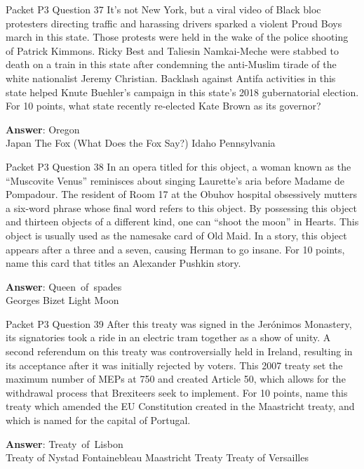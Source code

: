 \begin{frame}{Packet P3 Question 37}
It's not New York, but   a viral video of Black   bloc protesters directing traffic and harassing drivers sparked a violent Proud Boys march in this state. Those protests were held in the wake of the police shooting of Patrick Kimmons. Ricky Best and Taliesin Namkai-Meche were stabbed to death on a train in this state after condemning the anti-Muslim tirade of the white nationalist Jeremy Christian. Backlash against Antifa activities in this state helped Knute Buehler's campaign in this state's 2018 gubernatorial election. For 10 points, what state recently re-elected Kate Brown as its governor?    

\textbf{Answer}: Oregon\\
 Japan
 The Fox (What Does the Fox Say?)
 Idaho
 Pennsylvania
\end{frame}

\begin{frame}{Packet P3 Question 38}
In an opera titled for this object, a woman known as the ``Muscovite Venus'' reminisces about singing Laurette's aria before Madame de Pompadour.   The resident of Room 17 at the Obuhov hospital obsessively mutters a six-word phrase whose final word refers to this object. By possessing this object and thirteen objects of a different kind, one can ``shoot the moon'' in Hearts. This object is usually used as the namesake card of Old Maid. In a story, this object appears after a three and a seven, causing Herman to go insane. For 10 points, name   this card that titles an Alexander Pushkin story.    

\textbf{Answer}: Queen\ of\ spades\\
 Georges Bizet
 Light
 Moon
\end{frame}

\begin{frame}{Packet P3 Question 39}
After this treaty was signed in the Jerónimos Monastery, its signatories took a ride in an electric tram   together as a show of unity. A second referendum on this treaty was controversially held in Ireland, resulting in its acceptance after it was initially rejected by voters. This 2007 treaty set the maximum number of MEPs at 750 and created Article 50, which allows for the withdrawal process that Brexiteers seek to implement. For 10 points, name this treaty which amended the EU Constitution created in the Maastricht treaty, and which is named for the capital of Portugal.      

\textbf{Answer}: Treaty\ of\ Lisbon\\
 Treaty of Nystad
 Fontainebleau
 Maastricht Treaty
 Treaty of Versailles
\end{frame}


